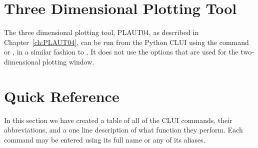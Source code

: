 \documentclass[12pt]{report}
\begin{document}
 \section{ Three Dimensional Plotting Tool}

 The \AUTO three dimensional plotting tool, {\cal PLAUT04}, as described
 in Chapter~\ref{ch:PLAUT04}, can be run from the Python CLUI
 using the command
  or , in a similar
 fashion to . It does not use the options that
 are used for the two-dimensional plotting window.

 \section{ Quick Reference } \label{sec:clui quick reference}

 In this section we have created a table of all of the \AUTO CLUI
 commands, their abbreviations, and a one line description of what
 function they perform.  Each command may be entered using 
 its full name or any of its aliases.
\end{document}
